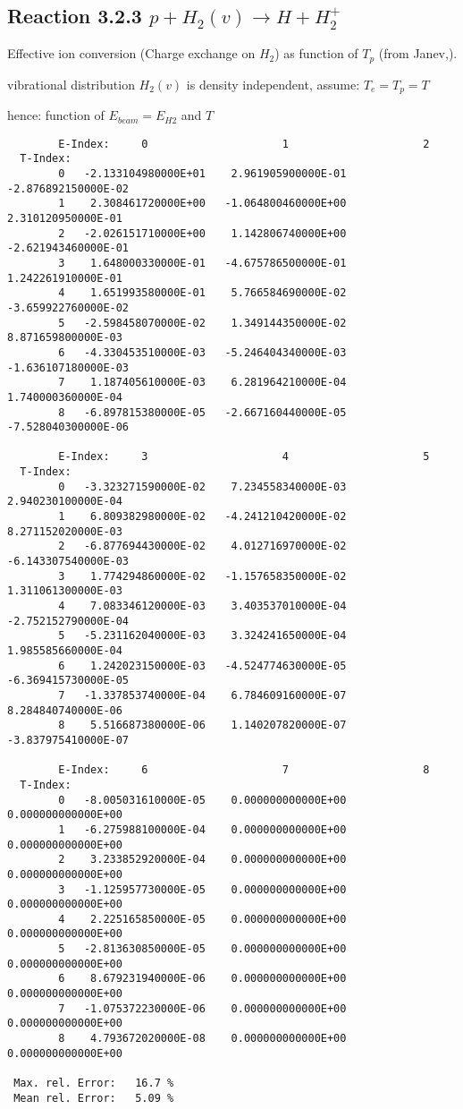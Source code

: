\documentclass[12pt,dvipdfmx]{article}
\begin{document}
\subsection{
Reaction 3.2.3  $  p + H_2(v) \rightarrow H + H_2^+  $
}
  Effective ion conversion (Charge exchange on $H_2$)
  as function of $T_p$ (from Janev,\cite{kn:Janev}).

  vibrational distribution $H_2(v)$ is density independent, assume: $T_e = T_p = T$

  hence: function of $E_{beam} = E_{H2}$ and $T$
\begin{small}\begin{verbatim}
        E-Index:     0                     1                     2
  T-Index:
        0   -2.133104980000E+01    2.961905900000E-01   -2.876892150000E-02
        1    2.308461720000E+00   -1.064800460000E+00    2.310120950000E-01
        2   -2.026151710000E+00    1.142806740000E+00   -2.621943460000E-01
        3    1.648000330000E-01   -4.675786500000E-01    1.242261910000E-01
        4    1.651993580000E-01    5.766584690000E-02   -3.659922760000E-02
        5   -2.598458070000E-02    1.349144350000E-02    8.871659800000E-03
        6   -4.330453510000E-03   -5.246404340000E-03   -1.636107180000E-03
        7    1.187405610000E-03    6.281964210000E-04    1.740000360000E-04
        8   -6.897815380000E-05   -2.667160440000E-05   -7.528040300000E-06

        E-Index:     3                     4                     5
  T-Index:
        0   -3.323271590000E-02    7.234558340000E-03    2.940230100000E-04
        1    6.809382980000E-02   -4.241210420000E-02    8.271152020000E-03
        2   -6.877694430000E-02    4.012716970000E-02   -6.143307540000E-03
        3    1.774294860000E-02   -1.157658350000E-02    1.311061300000E-03
        4    7.083346120000E-03    3.403537010000E-04   -2.752152790000E-04
        5   -5.231162040000E-03    3.324241650000E-04    1.985585660000E-04
        6    1.242023150000E-03   -4.524774630000E-05   -6.369415730000E-05
        7   -1.337853740000E-04    6.784609160000E-07    8.284840740000E-06
        8    5.516687380000E-06    1.140207820000E-07   -3.837975410000E-07

        E-Index:     6                     7                     8
  T-Index:
        0   -8.005031610000E-05    0.000000000000E+00    0.000000000000E+00
        1   -6.275988100000E-04    0.000000000000E+00    0.000000000000E+00
        2    3.233852920000E-04    0.000000000000E+00    0.000000000000E+00
        3   -1.125957730000E-05    0.000000000000E+00    0.000000000000E+00
        4    2.225165850000E-05    0.000000000000E+00    0.000000000000E+00
        5   -2.813630850000E-05    0.000000000000E+00    0.000000000000E+00
        6    8.679231940000E-06    0.000000000000E+00    0.000000000000E+00
        7   -1.075372230000E-06    0.000000000000E+00    0.000000000000E+00
        8    4.793672020000E-08    0.000000000000E+00    0.000000000000E+00

 Max. rel. Error:   16.7 %
 Mean rel. Error:   5.09 %
\end{verbatim}\end{small}
\end{document}
